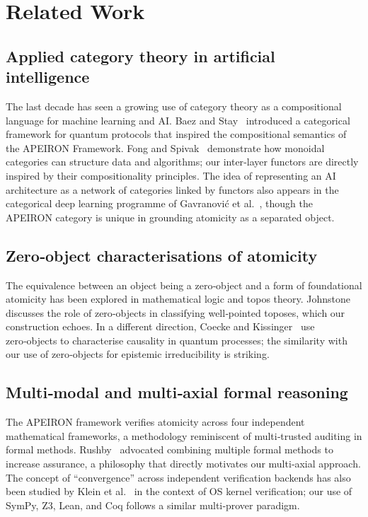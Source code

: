 \section{Related Work}\label{sec:related}

\subsection{Applied category theory in artificial intelligence}
The last decade has seen a growing use of category theory as a compositional language for machine learning and AI. 
Baez and Stay~\cite{BaezStay2011} introduced a categorical framework for quantum protocols that inspired the compositional semantics of the APEIRON Framework. 
Fong and Spivak~\cite{FongSpivak2019} demonstrate how monoidal categories can structure data and algorithms; our inter‑layer functors are directly inspired by their compositionality principles.
The idea of representing an AI architecture as a network of categories linked by functors also appears in the categorical deep learning programme of Gavranović et al.~\cite{Gavranovic2024}, though the APEIRON category is unique in grounding atomicity as a separated object.

\subsection{Zero‑object characterisations of atomicity}
The equivalence between an object being a zero‑object and a form of foundational atomicity has been explored in mathematical logic and topos theory.
Johnstone~\cite{Johnstone2002} discusses the role of zero‑objects in classifying well‑pointed toposes, which our construction echoes.
In a different direction, Coecke and Kissinger~\cite{CoeckeKissinger2017} use zero‑objects to characterise causality in quantum processes; the similarity with our use of zero‑objects for epistemic irreducibility is striking.

\subsection{Multi‑modal and multi‑axial formal reasoning}
The APEIRON framework verifies atomicity across four independent mathematical frameworks, a methodology reminiscent of multi‑trusted auditing in formal methods.
Rushby~\cite{Rushby2002} advocated combining multiple formal methods to increase assurance, a philosophy that directly motivates our multi‑axial approach.
The concept of “convergence” across independent verification backends has also been studied by Klein et al.~\cite{Klein2009} in the context of OS kernel verification; our use of SymPy, Z3, Lean, and Coq follows a similar multi‑prover paradigm.

